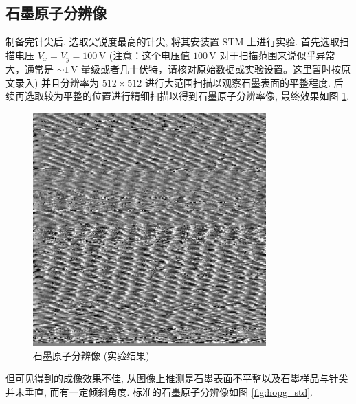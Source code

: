 \documentclass[12pt]{ctexart} %
\begin{document}
\subsection{石墨原子分辨像}
制备完针尖后, 选取尖锐度最高的针尖, 将其安装置 STM 上进行实验.
首先选取扫描电压 \( V_x = V_y = 100 \, \text{V} \) (注意：这个电压值 \(100\,\text{V}\) 对于扫描范围来说似乎异常大，通常是 \( \sim 1\,\text{V} \) 量级或者几十伏特，请核对原始数据或实验设置。这里暂时按原文录入) 并且分辨率为 \( 512 \times 512 \) 进行大范围扫描以观察石墨表面的平整程度. 后续再选取较为平整的位置进行精细扫描以得到石墨原子分辨率像, 最终效果如图 \ref{fig:hopg_exp}.

\begin{figure}[htbp]
 \centering
 \includegraphics[width=0.8\textwidth]{FIG4.png} %
 \caption{石墨原子分辨像 (实验结果)}
 \label{fig:hopg_exp}
\end{figure}
但可见得到的成像效果不佳, 从图像上推测是石墨表面不平整以及石墨样品与针尖并未垂直, 而有一定倾斜角度.
标准的石墨原子分辨像如图 \ref{fig:hopg_std}.
\end{document}
